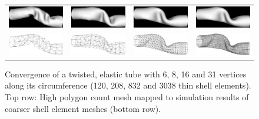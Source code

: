 \begin{figure}[tbh]
  \centering
  \begin{tabular}{cccc}
    \includegraphics[width=0.24\columnwidth]{img/twist-06-cg.png}
    &
    \includegraphics[width=0.24\columnwidth]{img/twist-08-cg.png}
    &
    \includegraphics[width=0.24\columnwidth]{img/twist-16-cg.png}
    &
    \includegraphics[width=0.24\columnwidth]{img/twist-31-cg.png}
    \\
    \includegraphics[width=0.24\columnwidth]{img/twist-06w-cg.png}
    &
    \includegraphics[width=0.24\columnwidth]{img/twist-08w-cg.png}
    &
    \includegraphics[width=0.24\columnwidth]{img/twist-16w-cg.png}
    &
    \includegraphics[width=0.24\columnwidth]{img/twist-31w-cg.png}
  \end{tabular}
  \caption{Convergence of a twisted, elastic tube with 6, 8, 16 and 31 vertices
  along its circumference (120, 208, 832 and 3038 thin shell elements). Top row: High polygon count mesh mapped to simulation results of coarser shell element meshes (bottom row).}
  \label{fig-convergence}
\end{figure}

